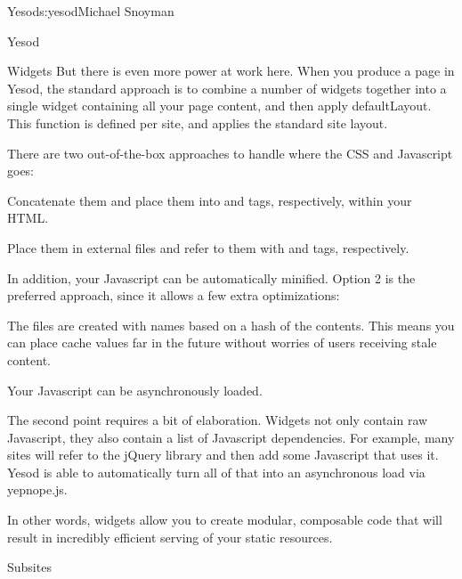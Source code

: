 \begin{aosachapter}{Yesod}{s:yesod}{Michael Snoyman}
\begin{aosasect1}{Yesod}
\begin{aosasect2}{Widgets}
But there is even more power at work here. When you produce a page in
Yesod, the standard approach is to combine a number of widgets
together into a single widget containing all your page content, and
then apply defaultLayout. This function is defined per site, and
applies the standard site layout.

There are two out-of-the-box approaches to handle where the CSS and
Javascript goes:

\begin{aosaenumerate}

\item Concatenate them and place them into  and
   tags, respectively, within your HTML.

\item Place them in external files and refer to them with 
  and  tags, respectively.
 
\end{aosaenumerate}

In addition, your Javascript can be automatically minified. Option 2
is the preferred approach, since it allows a few extra optimizations:

\begin{aosaenumerate}
 
\item The files are created with names based on a hash of the
  contents. This means you can place cache values far in the future
  without worries of users receiving stale content.
 
\item Your Javascript can be asynchronously loaded.
 
\end{aosaenumerate}

The second point requires a bit of elaboration. Widgets not only
contain raw Javascript, they also contain a list of Javascript
dependencies. For example, many sites will refer to the jQuery library
and then add some Javascript that uses it. Yesod is able to
automatically turn all of that into an asynchronous load via
yepnope.js.

In other words, widgets allow you to create modular, composable code
that will result in incredibly efficient serving of your static
resources.

\end{aosasect2}

\begin{aosasect2}{Subsites}


\end{aosasect2}
\end{aosasect1}
\end{aosachapter}
